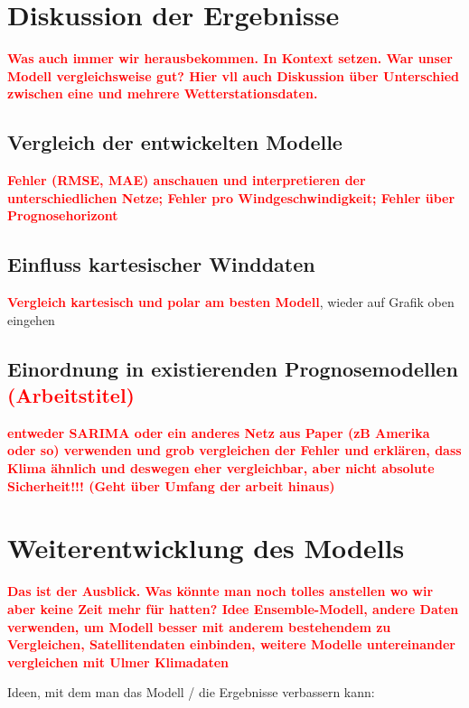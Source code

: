 \documentclass[
12pt, %
toc=listofnumbered, %
toc=chapterentrydotfill, %
numbers=noenddot, %
captions=tableheading, %
bibliography=numbered
]{scrreprt}
\let\Oldsection\section
\renewcommand{\section}{\FloatBarrier\Oldsection}
\let\Oldsubsection\subsection
\renewcommand{\subsection}{\FloatBarrier\Oldsubsection}
\newcommand{\highlight}[1]{\textbf{\textcolor{red}{#1}}}
\begin{document}
\section{Diskussion der Ergebnisse}
\highlight{Was auch immer wir herausbekommen. In Kontext setzen. War unser Modell vergleichsweise gut? Hier vll auch 
Diskussion über Unterschied zwischen eine und mehrere Wetterstationsdaten.}

\subsection{Vergleich der entwickelten Modelle}
\highlight{Fehler (RMSE, MAE) anschauen und interpretieren der unterschiedlichen Netze; 
Fehler pro Windgeschwindigkeit; Fehler über Prognosehorizont}

\subsection{Einfluss kartesischer Winddaten}
\highlight{Vergleich kartesisch und polar am besten Modell}, wieder auf Grafik oben eingehen

\subsection{Einordnung in existierenden Prognosemodellen \highlight{(Arbeitstitel)}}
\highlight{entweder SARIMA oder ein anderes Netz aus Paper (zB Amerika oder so) verwenden und grob vergleichen der Fehler und erklären, dass
 Klima ähnlich und deswegen eher vergleichbar, aber nicht absolute Sicherheit!!! (Geht über Umfang der arbeit hinaus)}

\section{Weiterentwicklung des Modells}
\highlight{Das ist der Ausblick. Was könnte man noch tolles anstellen wo wir aber keine Zeit mehr für hatten? Idee Ensemble-Modell, andere Daten 
verwenden, um Modell besser mit anderem bestehendem zu Vergleichen, Satellitendaten einbinden, weitere Modelle untereinander vergleichen mit Ulmer Klimadaten}

Ideen, mit dem man das Modell / die Ergebnisse verbassern kann:
\end{document}
